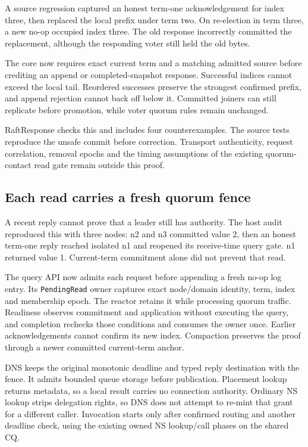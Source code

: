 A source regression captured an honest term-one acknowledgement for index three,
then replaced the local prefix under term two. On re-election in term three,
a new no-op occupied index three. The old response incorrectly committed the
replacement, although the responding voter still held the old bytes.

The core now requires exact current term and a matching admitted source before
crediting an append or completed-snapshot response. Successful indices cannot
exceed the local tail. Reordered successes preserve the strongest confirmed prefix, and
append rejection cannot back off below it. Committed joiners can still replicate
before promotion, while voter quorum rules remain unchanged.

RaftResponse checks this and includes four counterexamples. The source tests
reproduce the unsafe commit before correction. Transport authenticity, request
correlation, removal epochs and the timing assumptions of the existing
quorum-contact read gate remain outside this proof.

\subsection{Each read carries a fresh quorum fence}

A recent reply cannot prove that a leader still has authority. The host audit
reproduced this with three nodes: n2 and n3 committed value 2, then an honest
term-one reply reached isolated n1 and reopened its receive-time query gate.
n1 returned value 1. Current-term commitment alone did not prevent that read.

The query API now admits each request before appending a fresh no-op log entry.
Its \texttt{PendingRead} owner captures exact node/domain identity, term, index
and membership epoch. The reactor retains it while processing quorum traffic.
Readiness observes commitment and application without executing the query, and
completion rechecks those conditions and consumes the owner once. Earlier
acknowledgements cannot confirm its new index. Compaction preserves the proof
through a newer committed current-term anchor.

DNS keeps the original monotonic deadline and typed reply destination with the
fence. It admits bounded queue storage before publication. Placement lookup
returns metadata, so a local result carries no connection authority. Ordinary NS
lookup strips delegation rights, so DNS does not attempt to re-mint that grant
for a different caller. Invocation starts only after confirmed routing and
another deadline check, using the existing owned NS lookup/call phases on the
shared CQ.


